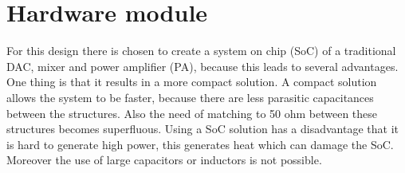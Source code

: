 \section{Hardware module}\label{sec:overview}
For this design there is chosen to create a system on chip (SoC) of a traditional DAC, mixer and power amplifier (PA), because this leads to several advantages. One thing is that it results in a more compact solution. A compact solution allows the system to be faster, because there are less parasitic capacitances between the structures. Also the need of matching to 50 ohm between these structures becomes superfluous. Using a SoC solution has a disadvantage that it is hard to generate high power, this generates heat which can damage the SoC. Moreover the use of large capacitors or inductors is not possible.
